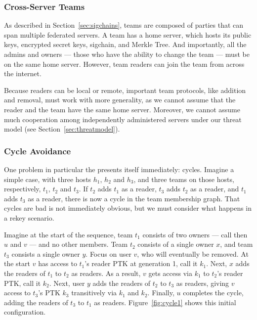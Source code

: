 \subsubsection{Cross-Server Teams}

As described in Section~\ref{sec:sigchains}, teams are composed of parties
that can span multiple federated servers. A team has a home server, which 
hosts its public keys, encrypted secret keys, sigchain, and Merkle Tree.
And importantly, all the admins and owners --- those who have the ability
to change the team --- must be on the same home server. However, team readers
can join the team from across the internet.

Because readers can be local or remote, important team protocols, like addition
and removal, must work with more generality, as we cannot assume that the reader
and the team have the same home server. Moreover, we cannot assume much
cooperation among independently administered servers under our threat model
(see Section~\ref{sec:threatmodel}).

\subsubsection{Cycle Avoidance}
\label{sec:team-index-range}

One problem in particular the presents itself immediately: cycles.
Imagine a simple case, with three hosts $h_1$, $h_2$ and $h_3$, and three teams
on those hosts, respectively, $t_1$, $t_2$ and $t_3$. If $t_2$ adds $t_1$ as a
reader, $t_3$ adds $t_2$ as a reader, and $t_1$ adds $t_3$ as a reader, there is
now a cycle in the team membership graph. That cycles are bad is not immediately
obvious, but we must consider what happens in a rekey scenario.

Imagine at the start of the sequence, team $t_1$ consists of two owners --- call
then $u$ and $v$ --- and no other members. Team $t_2$ consists of a single owner
$x$, and team $t_3$ consists a single owner $y$. Focus on user $v$, who will
eventually be removed.  At the start $v$ has access to $t_1$'s reader PTK at
generation 1, call it $k_1$.  Next, $x$ adds the readers of $t_1$ to $t_2$
as readers. As a result, $v$ gets access via $k_1$ to $t_2$'s reader PTK,
call it $k_2$. Next, user $y$ adds the readers of $t_2$ to $t_3$ as readers,
giving $v$ access to $t_3$'s PTK $k_3$ transitively via $k_1$ and $k_2$.
Finally, $u$ completes the cycle, adding the readers of $t_3$ to $t_1$ as readers.
Figure~\ref{fig:cycle1} shows this initial configuration. 

